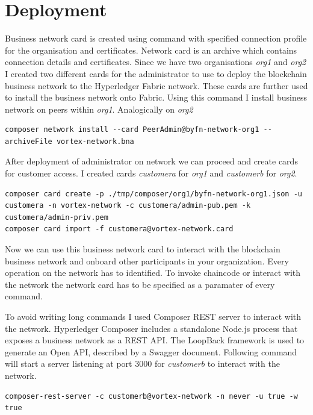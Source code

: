 \section{Deployment}

Business network card is created using  command with specified connection profile for the organisation and certificates. Network card is an archive which contains connection details and certificates. Since we have two organisations \emph{org1} and \emph{org2} I created two different cards for the administrator to use to deploy the blockchain business network to the Hyperledger Fabric network.
These cards are further used to install the business network onto Fabric. 
Using this command I install business network on peers within \emph{org1}. Analogically on \emph{org2}
\begin{lstlisting}
composer network install --card PeerAdmin@byfn-network-org1 --archiveFile vortex-network.bna
\end{lstlisting}

After deployment of administrator on network we can proceed and create cards for customer access. I created cards  \emph{customera} for \emph{org1} and \emph{customerb} for \emph{org2}. 
\begin{lstlisting}
composer card create -p ./tmp/composer/org1/byfn-network-org1.json -u customera -n vortex-network -c customera/admin-pub.pem -k customera/admin-priv.pem
composer card import -f customera@vortex-network.card
\end{lstlisting}

Now we can use this business network card to interact with the blockchain business network and onboard other participants in your organization. Every operation on the network has to identified. To invoke chaincode or interact with the network the network card has to be specified as a paramater of every command. 

To avoid writing long commands I used Composer REST server to interact with the network. Hyperledger Composer includes a standalone Node.js process that exposes a business network as a REST API. The LoopBack framework is used to generate an Open API, described by a Swagger document. Following command will start a server listening at port 3000 for \emph{customerb} to interact with the network. 

\begin{lstlisting}
composer-rest-server -c customerb@vortex-network -n never -u true -w true
\end{lstlisting}

